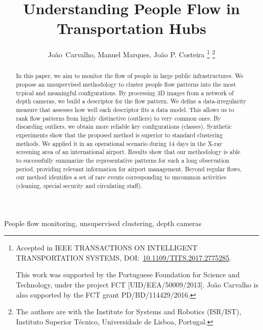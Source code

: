 \documentclass[journal]{IEEEtran}
\begin{document}
\title{Understanding People Flow in Transportation Hubs}
\author{Jo\~ao~Carvalho,
        Manuel Marques, Jo\~ao P. Costeira
\thanks{Accepted in IEEE TRANSACTIONS ON INTELLIGENT TRANSPORTATION SYSTEMS, DOI:~\href{https://doi.org/10.1109/TITS.2017.2775285}{10.1109/TITS.2017.2775285}. 
    
    This work was supported by the Portuguese Foundation for Science and Technology, under the project FCT [UID/EEA/50009/2013]. Jo\~ao Carvalho is also supported by the FCT grant PD/BD/114429/2016.}%
\thanks{The authors are with the Institute for Systems and Robotics (ISR/IST), Instituto Superior T\'ecnico, Universidade de Lisboa, Portugal.}}%

\maketitle

\begin{abstract}
    In this paper, we aim to monitor the flow of people in large public infrastructures. 
        We propose an unsupervised methodology to cluster people flow patterns into the most typical and meaningful configurations. By processing 3D images from a network of depth cameras, we build a descriptor for the flow pattern. We define a data-irregularity measure that assesses how well each descriptor fits a data model. This allows us to rank flow patterns from highly distinctive (outliers) to very common ones. By discarding outliers, we obtain more reliable key configurations (classes).
    Synthetic experiments show that the proposed method is superior to standard clustering methods.
        We applied it in an operational scenario during 14 days in the X-ray screening area of an international airport. 
    Results show that our methodology is able to successfully summarize the representative patterns for such a long observation period, providing relevant information for airport management. 
    Beyond regular flows, our method identifies a set of rare events corresponding to uncommon activities (cleaning, special security and circulating staff). 
\end{abstract}

\begin{IEEEkeywords}
	People flow monitoring, unsupervised clustering, depth cameras
\end{IEEEkeywords}

%

%

%

%
%
 
\end{document}
